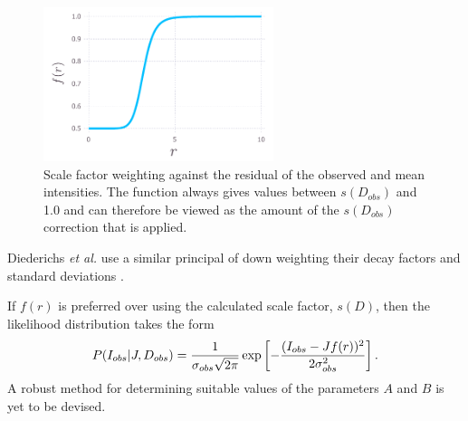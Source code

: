 \begin{figure}
  \centering
  \includegraphics[width=0.6\textwidth]{figures/zde/scale_factor_function.pdf}
    \caption[Scale factor weighting against the residual of the observed and mean intensities.]{Scale factor weighting against the residual of the observed and mean intensities.
    The function always gives values between $s(D_{obs})$ and 1.0 and can therefore be viewed as the amount of the $s(D_{obs})$ correction that is applied.}
    \label{fig:Scale factor weighting - Extrapolation method}
\end{figure}
Diederichs \textit{et al.} use a similar principal of down weighting their decay factors and standard deviations \cite{diederichs2003}.

If $f(r)$ is preferred over using the calculated scale factor, $s(D)$, then the likelihood distribution takes the form
\begin{equation}
    P(I_{obs} | J, D_{obs}) = \frac{1}{\sigma_{obs} \sqrt{2\pi}} \exp \left[-\frac{(I_{obs} - J f(r))^2}{2 \sigma^2_{obs}} \right].
    \label{eq:Normally distributed intensity with weighted scale factor - Extrapolation method}
\end{equation}
A robust method for determining suitable values of the parameters $A$ and $B$ is yet to be devised.

